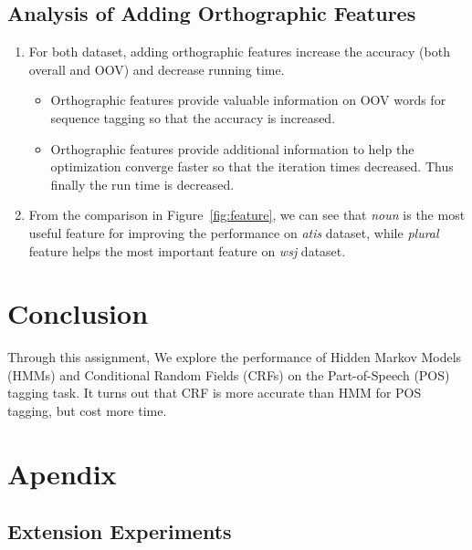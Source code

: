 \documentclass[winfonts,UTF8]{article}
\begin{document}
\subsection{Analysis of Adding Orthographic Features}
\begin{enumerate}
\item For both dataset, adding orthographic features increase the accuracy (both overall and OOV) and decrease running time.
\begin{itemize}
\item Orthographic features provide valuable information on OOV words for sequence tagging so that the accuracy is increased.
\item Orthographic features provide additional information to help the optimization converge faster so that the iteration times decreased. Thus finally the run time is decreased.
\end{itemize}
\item From the comparison in Figure~\ref{fig:feature}, we can see that \emph{noun} is the most useful feature for improving the performance on \emph{atis} dataset, while \emph{plural} feature helps the most important feature on \emph{wsj} dataset.

\end{enumerate}


\section{Conclusion}
Through this assignment, We explore the performance of Hidden Markov Models (HMMs) and Conditional Random Fields (CRFs) on the Part-of-Speech (POS) tagging task. It turns out that CRF is more accurate than HMM for POS tagging, but cost more time.





%

\section{Apendix} \label{appendix}

\subsection{Extension Experiments}
\end{document}
